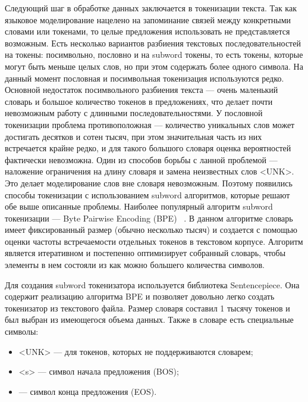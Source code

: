 Следующий шаг в обработке данных заключается в токенизации текста. Так как языковое моделирование нацелено на запоминание связей между конкретными словами или токенами, то целые предложения использовать не представляется возможным. Есть несколько вариантов разбиения текстовых последовательностей на токены: посимвольно, пословно и на subword токены, то есть токены, которые могут быть меньше целых слов, но при этом содержать более одного символа. На данный момент пословная и посимвольная токенизация используются редко. Основной недостаток посимвольного разбиения текста --- очень маленький словарь и большое количество токенов в предложениях, что делает почти невозможным работу с длинными последовательностями. У пословной токенизации проблема противоположная --- количество уникальных слов может достигать десятков и сотен тысяч, при этом значительная часть из них встречается крайне редко, и для такого большого словаря оценка вероятностей фактически невозможна. Один из способов борьбы с ланной проблемой --- наложение ограничения на длину словаря и замена неизвестных слов <UNK>. Это делает моделирование слов вне словаря невозможным. Поэтому появились способы токенизации с использованием subword алгоритмов, которые решают обе выше описанные проблемы. Наиболее популярный алгоритм subword токенизации --- Byte Pairwise Encoding (BPE) ~\cite{bpe}. В данном алгоритме словарь имеет фиксированный размер (обычно несколько тысяч) и создается с помощью оценки частоты встречаемости отдельных токенов в текстовом корпусе. Алгоритм является итеративном и постепенно оптимизирует собранный словарь, чтобы элементы в нем состояли из как можно большего количества символов.

Для создания subword токенизатора используется библиотека Sentencepiece. Она содержит реализацию алгоритма BPE и позволяет довольно легко создать токенизатор из текстового файла. Размер словаря составил 1 тысячу токенов и был выбран из имеющегося объема данных. Также в словаре есть специальные символы:

\begin{itemize}
	\item <UNK> --- для токенов, которых не поддерживаются словарем;
	\item <s> --- символ начала предложения (BOS);
	\item {} --- символ конца предложения (EOS).
\end{itemize}

